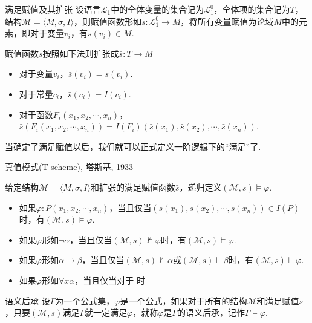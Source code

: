 \documentclass[main.tex]{subfiles}
\begin{document}
\begin{definition}{满足赋值及其扩张}
    设语言\(\mathcal{L}_1\)中的全体变量的集合记为\(\mathcal{L}_1^0\)，全体项的集合记为\(T\)，结构\(\mathcal{M} = \langle M,\sigma, I \rangle\)，则赋值函数形如\(s:\mathcal{L}_1^0 \to M\)，将所有变量赋值为论域\(M\)中的元素，即对于变量\(v_i\)，有\(s(v_i) \in M\).

    赋值函数\(s\)按照如下法则扩张成\(\bar{s}: T \to M\)
    \begin{itemize}
        \item 对于变量\(v_i\)，\(\bar{s}(v_i) = s(v_i)\).
        \item 对于常量\(c_i\)，\(\bar{s}(c_i) = I(c_i)\).
        \item 对于函数\(F_i(x_1, x_2, \cdots, x_n)\)，\(\bar{s}(F_i(x_1, x_2, \cdots, x_n)) = I(F_i)(\bar s(x_1), \bar s(x_2), \cdots, \bar s(x_n))\).
    \end{itemize}
\end{definition}

当确定了满足赋值以后，我们就可以正式定义一阶逻辑下的“满足”了.

\begin{definition}{真值模式(T-scheme), 塔斯基, 1933}

    给定结构\(\mathcal{M} = \langle M,\sigma, I \rangle\)和扩张的满足赋值函数\(\bar{s}\)，递归定义\((\mathcal{M}, s) \vDash \varphi\).

    \begin{itemize}
        \item 如果\(\varphi: P(x_1,x_2,\cdots,x_n)\)，当且仅当\((\bar s(x_1), \bar s(x_2), \cdots, \bar s(x_n)) \in I(P)\)时，有\((\mathcal{M}, s) \vDash \varphi\).
        \item 如果\(\varphi\)形如\(\neg \alpha\)，当且仅当\((\mathcal{M}, s) \not \vDash \varphi\)时，有\((\mathcal{M}, s) \vDash \varphi\).
        \item 如果\(\varphi\)形如\(\alpha \to \beta\)，当且仅当\((\mathcal{M}, s) \not \vDash \alpha\)或\((\mathcal{M}, s) \vDash \beta\)时，有\((\mathcal{M}, s) \vDash \varphi\).
        \item 如果\(\varphi\)形如\(\forall x \alpha\)，当且仅当对于   时
    \end{itemize}

\end{definition}

\begin{definition}{语义后承}
    设\(\Gamma\)为一个公式集，\(\varphi\)是一个公式，如果对于所有的结构\(\mathcal{M}\)和满足赋值\(s\)，只要\((\mathcal{M}, s)\)满足\(\Gamma\)就一定满足\(\varphi\)，就称\(\varphi\)是\(\Gamma\)的语义后承，记作\(\Gamma \vDash \varphi\).
\end{definition}
\end{document}
